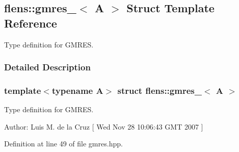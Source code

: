 \hypertarget{structflens_1_1gmres__}{
\subsection{flens::gmres\_\-$<$ A $>$ Struct Template Reference}
\label{structflens_1_1gmres__}
}
Type definition for GMRES.  




\subsubsection{Detailed Description}
\subsubsection*{template$<$typename A$>$ struct flens::gmres\_\-$<$ A $>$}

Type definition for GMRES. 

\begin{Desc}
\item[Author:]Luis M. de la Cruz \mbox{[} Wed Nov 28 10:06:43 GMT 2007 \mbox{]} \end{Desc}


Definition at line 49 of file gmres.hpp.